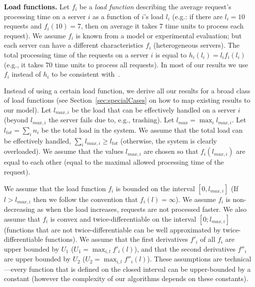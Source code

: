 \documentclass[11pt]{article}
\newcommand{\ltot}{{{l_{\mathit{tot}}}}}
\newcommand{\lmax}{{{l_{\mathit{max}}}}}
\newcommand{\lmaxi}{{{l_{\mathit{max}, i}}}}
\begin{document}
\noindent
\textbf{Load functions.}\quad
Let $f_i$ be a \emph{load function} describing the average request's processing time on a server $i$ as a function of $i$'s load $l_i$ (e.g.: if there are $l_i=10$ requests and $f_i(10)=7$, then on average it takes $7$ time units to process each request). We assume $f_i$ is known from a model or experimental evaluation; but each server can have a different characteristics $f_i$ (heterogeneous servers).
The total processing time of the requests on a server $i$ is equal to $h_i(l_i) = l_{i} f_{i}(l_i)$ (e.g., it takes $70$ time units to process all requests). 
In most of our results we use $f_i$ instead of $h_i$ to be consistent with~\cite{Liu:2011:GGL:1993744.1993767}.



Instead of using a certain load function, we derive all our results for a broad class of load functions (see Section~\ref{sec:specialCases} on how to map existing results to our model). 
Let $\lmaxi$ be the load that can be effectively handled on a server $i$ (beyond $\lmaxi$ the server fails due to, e.g., trashing). 
Let $\lmax = \max_{i} \lmaxi$. 
Let $\ltot = \sum_i n_i$ be the total load in the system. 
We assume that the total load can be effectively handled, $\sum_i \lmaxi \geq \ltot$ (otherwise, the system is clearly overloaded). We assume that the values $\lmaxi$ are chosen so that $f_i(\lmaxi)$ are equal to each other (equal to the maximal allowed processing time of the request). 

We assume that the load function $f_{i}$ is bounded on the interval $[0, \lmaxi]$ (If $l > \lmaxi$ then we follow the convention that $f_i(l) = \infty$). We assume $f_i$ is non-decreasing as when the load increases, requests are not processed faster.
We also assume that $f_i$ is convex and twice-differentiable on the interval $[0; \lmaxi]$ (functions that are not twice-differentiable can be well approximated by twice-differentiable functions). 
We assume that the first derivatives $f'_i$ of all $f_i$ are upper bounded by $U_1$ ($U_1 = \max_{i, l} f'_i(l)$), 
and that the second derivatives $f''_i$ are upper bounded by $U_2$ ($U_2 = \max_{i, l} f''_i(l)$).
These assumptions are technical---every function that is defined on the closed interval can be upper-bounded by a constant (however the complexity of our algorithms depends on these constants).







\medskip
\end{document}
